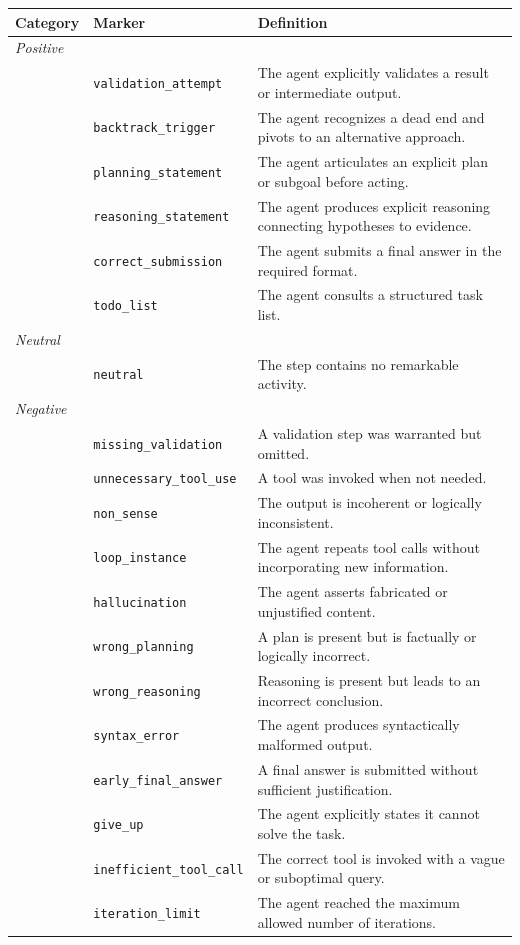 \begin{tabular}{llp{8cm}}
\toprule
\textbf{Category} & \textbf{Marker} & \textbf{Definition} \\
\midrule
\textit{Positive} & & \\
\midrule
         & \texttt{validation\_attempt}    & The agent explicitly validates a result or intermediate output. \\
         & \texttt{backtrack\_trigger}     & The agent recognizes a dead end and pivots to an alternative approach. \\
         & \texttt{planning\_statement}    & The agent articulates an explicit plan or subgoal before acting. \\
         & \texttt{reasoning\_statement}   & The agent produces explicit reasoning connecting hypotheses to evidence. \\
         & \texttt{correct\_submission}    & The agent submits a final answer in the required format. \\
         & \texttt{todo\_list}             & The agent consults a structured task list. \\
\midrule
\textit{Neutral} & & \\
\midrule
         & \texttt{neutral}                & The step contains no remarkable activity. \\
\midrule
\textit{Negative} \\
\midrule
         & \texttt{missing\_validation}    & A validation step was warranted but omitted. \\
         & \texttt{unnecessary\_tool\_use} & A tool was invoked when not needed. \\
         & \texttt{non\_sense}             & The output is incoherent or logically inconsistent. \\
         & \texttt{loop\_instance}         & The agent repeats tool calls without incorporating new information. \\
         & \texttt{hallucination}          & The agent asserts fabricated or unjustified content. \\
         & \texttt{wrong\_planning}        & A plan is present but is factually or logically incorrect. \\
         & \texttt{wrong\_reasoning}       & Reasoning is present but leads to an incorrect conclusion. \\
         & \texttt{syntax\_error}          & The agent produces syntactically malformed output. \\
         & \texttt{early\_final\_answer}   & A final answer is submitted without sufficient justification. \\
         & \texttt{give\_up}               & The agent explicitly states it cannot solve the task. \\
         & \texttt{inefficient\_tool\_call}& The correct tool is invoked with a vague or suboptimal query. \\
         & \texttt{iteration\_limit}       & The agent reached the maximum allowed number of iterations. \\
\bottomrule
\end{tabular}